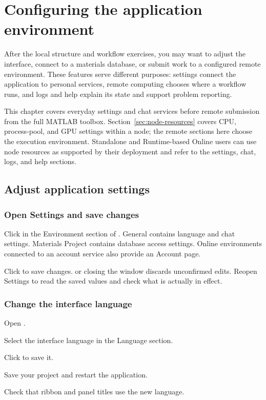 \chapter{Configuring the application environment}\label{ch:remote}

After the local structure and workflow exercises, you may want to adjust the interface, connect to a materials database, or submit work to a configured remote environment. These features serve different purposes: settings connect the application to personal services, remote computing chooses where a workflow runs, and logs and help explain its state and support problem reporting.

This chapter covers everyday settings and chat services before remote submission from the full MATLAB\regmark{} toolbox. Section~\ref{sec:node-resources} covers CPU, process-pool, and GPU settings within a node; the remote sections here choose the execution environment. Standalone and Runtime-based Online users can use node resources as supported by their deployment and refer to the settings, chat, logs, and help sections.

\section{Adjust application settings}

\subsection{Open Settings and save changes}

Click  in the Environment section of . General contains language and chat settings. Materials Project contains database access settings. Online environments connected to an account service also provide an Account page.

Click  to save changes.  or closing the window discards unconfirmed edits. Reopen Settings to read the saved values and check what is actually in effect.

\subsection{Change the interface language}

\begin{steps}
\item Open .
\item Select the interface language in the Language section.
\item Click  to save it.
\item Save your project and restart the application.
\item Check that ribbon and panel titles use the new language.
\end{steps}

